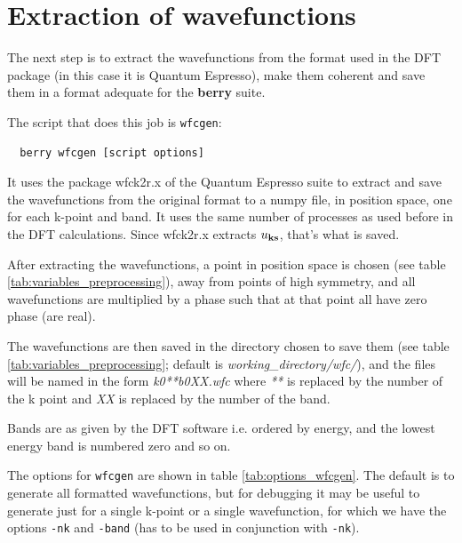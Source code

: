\documentclass[a4paper,12pt]{report}
\begin{document}
\section{Extraction of wavefunctions}

The next step is to extract the wavefunctions from the format used in the DFT package
(in this case it is {\sc Quantum Espresso}),
make them coherent and save them in a format adequate for the \textbf{berry} suite.

The script that does this job is \texttt{wfcgen}:
\begin{verbatim}
  berry wfcgen [script options]
\end{verbatim}

It uses the package wfck2r.x of the {\sc Quantum Espresso} suite to extract and save the wavefunctions
from the original format to a numpy file, in position space, one for each k-point and band.
It uses the same number of processes as used before in the DFT calculations.
Since wfck2r.x extracts $u_{\bf{k}s}$, that's what is saved.

After extracting the wavefunctions,
 a point in position space is chosen (see table \ref{tab:variables_preprocessing}),
away from points of high symmetry, and all wavefunctions
are multiplied by a phase such that at that point all have zero phase (are real).

The wavefunctions are then saved in the directory chosen to save them
(see table \ref{tab:variables_preprocessing}; default is \emph{working\_directory/}\emph{wfc/}),
and the files will be named in the form \emph{k0**b0XX.wfc} where \emph{**} is replaced by the number of the k point
and \emph{XX} is replaced by the number of the band.

Bands are as given by the DFT software i.e. ordered by energy,
and the lowest energy band is numbered zero and so on.

The options for \texttt{wfcgen} are shown in table \ref{tab:options_wfcgen}.
The default is to generate all formatted wavefunctions, but for debugging it may be useful
to generate just for a single k-point or a single wavefunction, for which we have the options
\texttt{-nk} and \texttt{-band} (has to be used in conjunction with \texttt{-nk}).
\end{document}
